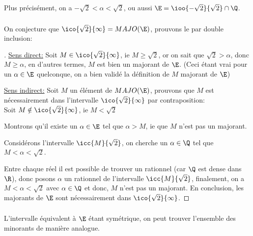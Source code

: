 Plus précisément, on a $-\sqrt{2} < \alpha < \sqrt{2}$, ou aussi $\E = \ioo{-\sqrt{2}}{\sqrt{2}} \cap \Q$.

\subsubsection*{}

On conjecture que $\ico{\sqrt{2}}{\infty} = MAJO(\E)$, prouvons le par double inclusion:

\begin{proof}[\unskip\nopunct]
   \underline{Sens direct:}\+
   Soit $M \in \ico{\sqrt{2}}{\infty}$, ie $M \geq \sqrt{2}$, or on sait que $\sqrt{2} > \alpha$, donc $M \geq \alpha$, en d'autres termes, $M$ est bien un majorant de $\E$. (Ceci étant vrai pour un \(\alpha \in \E\) quelconque, on a bien validé la définition de \(M\) majorant de $\E$)\<

   \underline{Sens indirect:}\+
   Soit $M$ un élément de $MAJO(\E)$, prouvons que $M$ est nécessairement dans l'intervalle $\ico{\sqrt{2}}{\infty}$ par contraposition:\\
   Soit $M \notin \ico{\sqrt{2}}{\infty}$, ie $M < \sqrt{2}$

   Montrons qu'il existe un $\alpha \in \E$ tel que $\alpha > M$, ie que $M$ n'est pas un majorant.\< 

   Considérons l'intervalle $\icc{M}{\sqrt{2}}$, on cherche un $\alpha \in \Q$ tel que $M < \alpha < \sqrt{2}$.

   Entre chaque réel il est possible de trouver un rationnel (car $\Q$ est dense dans $\R$), donc posons $\alpha$ un rationnel de l'intervalle $\icc{M}{\sqrt{2}}$, finalement, on a $M < \alpha < \sqrt{2}$ avec $\alpha \in \Q$ et donc, $M$ n'est pas un majorant.\+
   En conclusion, les majorants de $\E$ sont nécessairement dans $\ico{\sqrt{2}}{\infty}$.
\end{proof}

\subsubsection*{}

L'intervalle équivalent à $\E$ étant symétrique, on peut trouver l'ensemble des minorants de manière analogue.

\subsubsection*{}

